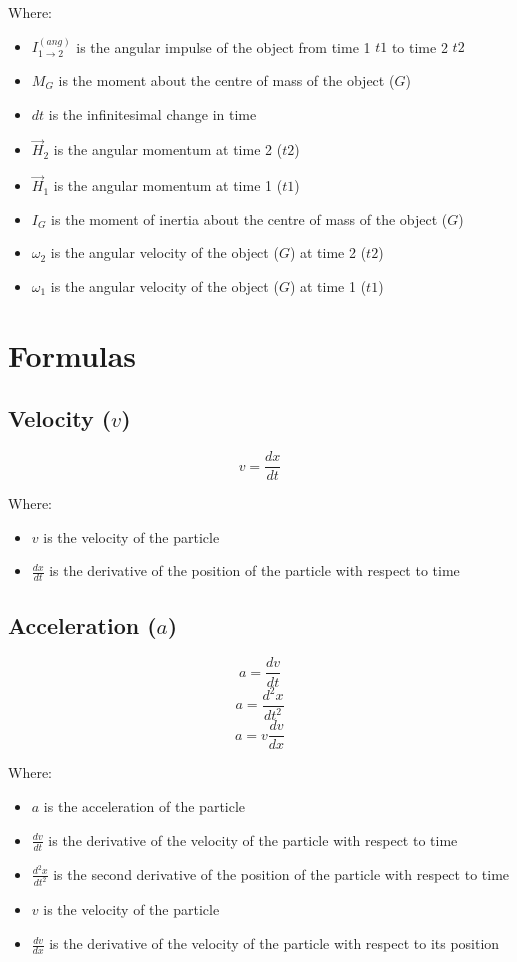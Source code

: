 \documentclass[11pt]{article}
\begin{document}
Where:
\begin{itemize}
\item \(I_{1 \rightarrow 2}^{(ang)}\) is the angular impulse of the object from time 1 \(t1\) to time 2 \(t2\)
\item \(M_G\) is the moment about the centre of mass of the object (\(G\))
\item \(dt\) is the infinitesimal change in time
\item \(\vec{H}_2\) is the angular momentum at time 2 (\(t2\))
\item \(\vec{H}_1\) is the angular momentum at time 1 (\(t1\))
\item \(I_G\) is the moment of inertia about the centre of mass of the object (\(G\))
\item \(\omega_{2}\) is the angular velocity of the object (\(G\)) at time 2 (\(t2\))
\item \(\omega_{1}\) is the angular velocity of the object (\(G\)) at time 1 (\(t1\))
\end{itemize}

 \newpage

\section{Formulas}
\label{sec:orgabe6bc1}

\subsection{Velocity (\(v\))}
\label{sec:orgc08aada}
\[v = \frac{dx}{dt}\]

Where:
\begin{itemize}
\item \(v\) is the velocity of the particle
\item \(\frac{dx}{dt}\) is the derivative of the position of the particle with respect to time
\end{itemize}

\subsection{Acceleration (\(a\))}
\label{sec:org4dc9662}
\[a = \frac{dv}{dt}\]
\[a = \frac{d^2x}{dt^2}\]
\[a = v \frac{dv}{dx}\]

Where:
\begin{itemize}
\item \(a\) is the acceleration of the particle
\item \(\frac{dv}{dt}\) is the derivative of the velocity of the particle with respect to time
\item \(\frac{d^2x}{dt^2}\) is the second derivative of the position of the particle with respect to time
\item \(v\) is the velocity of the particle
\item \(\frac{dv}{dx}\) is the derivative of the velocity of the particle with respect to its position
\end{itemize}
\end{document}
